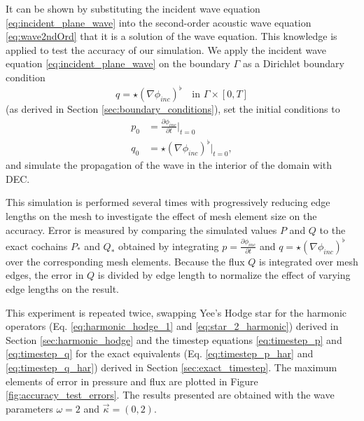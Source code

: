 \documentclass[utf8,english]{gradu3}
\begin{document}
It can be shown by substituting the incident wave equation \eqref{eq:incident_plane_wave}
into the second-order acoustic wave equation \eqref{eq:wave2ndOrd}
that it is a solution of the wave equation.
This knowledge is applied to test the accuracy of our simulation.
We apply the incident wave equation \eqref{eq:incident_plane_wave}
on the boundary $\Gamma$ as a Dirichlet boundary condition
\begin{equation}\label{eq:plane_wave_boundary_dirichlet}
  q = \star (\nabla \phi_{inc})^{\flat} \quad \text{in } \Gamma \times [0,T]
\end{equation}
(as derived in Section \ref{sec:boundary_conditions}),
set the initial conditions to
\begin{align}
  p_0 &= \frac{\partial \phi_{inc}}{\partial t} \Big|_{t=0} \\
  q_0 &= \star (\nabla \phi_{inc})^{\flat} \Big|_{t=0},
\end{align}
and simulate the propagation of the wave in the interior of the domain with DEC.

This simulation is performed several times with progressively reducing
edge lengths on the mesh to investigate the effect of mesh element size on the accuracy.
Error is measured by comparing the simulated values $P$ and $Q$ to the exact cochains
$P_*$ and $Q_*$ obtained by integrating $p = \frac{\partial \phi_{inc}}{\partial t}$
and $q = \star (\nabla \phi_{inc})^{\flat}$ over the corresponding mesh elements.
Because the flux $Q$ is integrated over mesh edges, the error in $Q$ is divided
by edge length to normalize the effect of varying edge lengths on the result.

This experiment is repeated twice, swapping Yee's Hodge star
for the harmonic operators (Eq. \eqref{eq:harmonic_hodge_1} and \eqref{eq:star_2_harmonic})
derived in Section \ref{sec:harmonic_hodge}
and the timestep equations \eqref{eq:timestep_p} and \eqref{eq:timestep_q}
for the exact equivalents (Eq. \eqref{eq:timestep_p_har} and \eqref{eq:timestep_q_har})
derived in Section \ref{sec:exact_timestep}.
The maximum elements of error in pressure and flux
are plotted in Figure \ref{fig:accuracy_test_errors}.
The results presented are obtained with the wave parameters
$\omega = 2$ and $\vec{\kappa} = (0,2)$.
\end{document}
